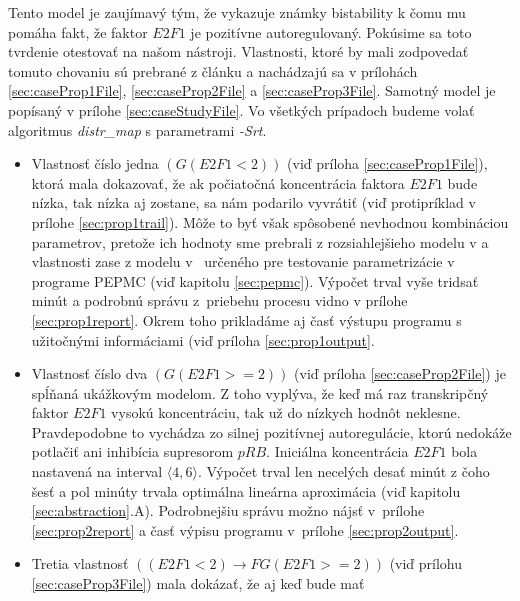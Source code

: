 \documentclass[11pt,final,oneside]{fithesis}
\begin{document}
Tento model je zauj\'imav\'y t\'ym, \v ze vykazuje zn\'amky bistability k \v comu mu pom\'aha fakt, \v ze faktor $E2F1$ je pozit\'ivne autoregulovan\'y. 
Pok\'usime sa toto tvrdenie otestova\v t na na\v som n\'astroji. Vlastnosti, ktor\'e by mali zodpoveda\v t tomuto chovaniu s\'u prebran\'e z \v cl\'anku
\cite{TCBB-2010} a nach\'adzaj\'u sa v pr\'iloh\'ach \ref{sec:caseProp1File}, \ref{sec:caseProp2File} a \ref{sec:caseProp3File}. Samotn\'y model je pop\'isan\'y 
v pr\'ilohe \ref{sec:caseStudyFile}. Vo v\v setk\'ych pr\'ipadoch budeme vola\v t algoritmus {\it distr\_map} s parametrami {\it -Srt}.
\begin{itemize}
\item Vlastnos\v t \v c\'islo jedna $(G(E2F1 < 2))$ (vi\v d pr\'iloha \ref{sec:caseProp1File}), ktor\'a mala dokazova\v t, \v ze ak po\v ciato\v cn\'a 
koncentr\'acia faktora $E2F1$ bude n\'izka, tak n\'izka aj zostane, sa n\'am podarilo vyvr\'ati\v t (vi\v d protipr\'iklad v 
pr\'ilohe \ref{sec:prop1trail}). M\^ o\v ze to by\v t v\v sak sp\^ osoben\'e nevhodnou kombin\'aciou
parametrov, preto\v ze ich hodnoty sme prebrali z rozsiahlej\v sieho modelu v \cite{Swat:2004} a vlastnosti zase z modelu v~\cite{TCBB-2010} ur\v cen\'eho 
pre testovanie parametriz\'acie v programe PEPMC (vi\v d kapitolu \ref{sec:pepmc}). V\'ypo\v cet trval vy\v se tridsa\v t min\'ut a podrobn\'u spr\'avu 
z~priebehu procesu vidno v pr\'ilohe \ref{sec:prop1report}. Okrem toho priklad\'ame aj \v cas\v t v\'ystupu programu s u\v zito\v cn\'ymi inform\'aciami 
(vi\v d pr\'iloha \ref{sec:prop1output}.
\item Vlastnos\v t \v c\'islo dva $(G(E2F1 >= 2))$ (vi\v d pr\'iloha \ref{sec:caseProp2File}) je sp\'l\v nan\'a uk\'a\v zkov\'ym modelom. Z toho vypl\'yva, 
\v ze ke\v d m\'a raz transkrip\v cn\'y faktor $E2F1$ vysok\'u koncentr\'aciu, tak u\v z do n\'izkych hodn\^ ot neklesne. Pravdepodobne to vych\'adza 
zo silnej pozit\'ivnej autoregul\'acie, ktor\'u nedok\'a\v ze potla\v ci\v t ani inhib\'icia supresorom $pRB$. Inici\'alna koncentr\'acia $E2F1$ bola 
nastaven\'a na interval $\langle4,6\rangle$. V\'ypo\v cet trval len necel\'ych desa\v t min\'ut z \v coho \v ses\v t a pol min\'uty trvala optim\'alna 
line\'arna aproxim\'acia (vi\v d kapitolu \ref{sec:abstraction}.A). Podrobnej\v siu spr\'avu mo\v zno n\'ajs\v t v~pr\'ilohe \ref{sec:prop2report} a 
\v cas\v t v\'ypisu programu v~pr\'ilohe \ref{sec:prop2output}.
\item Tretia vlastnos\v t $((E2F1 < 2) \rightarrow F G(E2F1 >= 2))$ (vi\v d pr\'ilohu \ref{sec:caseProp3File}) mala dok\'aza\v t, \v ze aj ke\v d bude ma\v t 

\end{itemize}
\end{document}
